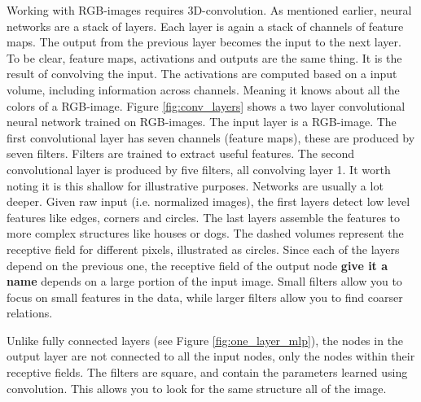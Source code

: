 \documentclass{article}
\begin{document}
Working with RGB-images requires 3D-convolution. As mentioned earlier, neural networks are a stack of layers. Each layer is again a stack of channels of feature maps. The output from the previous layer becomes the input to the next layer. To be clear, feature maps, activations and outputs are the same thing. It is the result of convolving the input. The activations are computed based on a input volume, including information across channels. Meaning it knows about all the colors of a RGB-image. Figure \ref{fig:conv_layers} shows a two layer convolutional neural network trained on RGB-images. The input layer is a RGB-image. The first convolutional layer has seven channels (feature maps), these are produced by seven filters. Filters are trained to extract useful features. The second convolutional layer is produced by five filters, all convolving layer 1. It worth noting it is this shallow for illustrative purposes. Networks are usually a lot deeper. Given raw input (i.e. normalized images), the first layers detect low level features like edges, corners and circles. The last layers assemble the features to more complex structures like houses or dogs. The dashed volumes represent the receptive field for different pixels, illustrated as circles. Since each of the layers depend on the previous one, the receptive field of the output node \textbf{give it a name} depends on a large portion of the input image. Small filters allow you to focus on small features in the data, while larger filters allow you to find coarser relations. 

Unlike fully connected layers (see Figure \ref{fig:one_layer_mlp}), the nodes in the output layer are not connected to all the input nodes, only the nodes within their receptive fields. The filters are square, and contain the parameters learned using convolution. This allows you to look for the same structure all of the image. %
\end{document}
